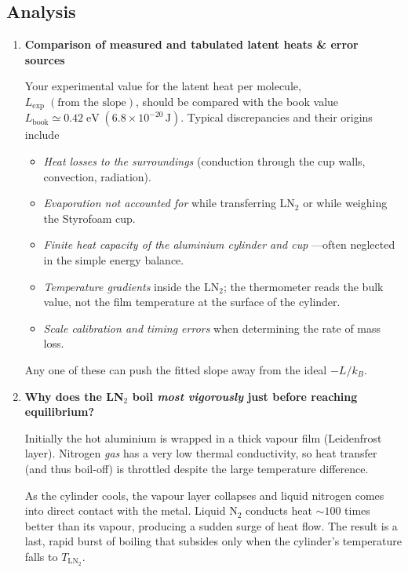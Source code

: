 \documentclass[12pt]{article}
\theoremstyle{definition} %
\theoremstyle{plain} %
\begin{document}
\subsection*{Analysis}

\begin{enumerate}
  \item \textbf{Comparison of measured and tabulated latent heats \& error sources}

        Your experimental value for the latent heat per molecule,
        \(
           L_{\text{exp}}\;(\text{from the slope})
        \),
        should be compared with the book value  
        \(
           L_{\text{book}}\simeq 0.42\;\text{eV}\;(6.8\times10^{-20}\,\mathrm{J})
        \).
        Typical discrepancies and their origins include
        \begin{itemize}
          \item \emph{Heat losses to the surroundings}  
                (conduction through the cup walls, convection, radiation).
          \item \emph{Evaporation not accounted for} while transferring LN\(_2\)
                or while weighing the Styrofoam cup.
          \item \emph{Finite heat capacity of the aluminium cylinder and cup}  
                —often neglected in the simple energy balance.
          \item \emph{Temperature gradients} inside the LN\(_2\); the
                thermometer reads the bulk value, not the film temperature at
                the surface of the cylinder.
          \item \emph{Scale calibration and timing errors} when determining the
                rate of mass loss.
        \end{itemize}
        Any one of these can push the fitted slope away from the ideal
        \(-L/k_B\).

  \item \textbf{Why does the LN\(_2\) boil \emph{most vigorously} just before
        reaching equilibrium?}

        Initially the hot aluminium is wrapped in a thick vapour film
        (Leidenfrost layer).  
        Nitrogen \emph{gas} has a very low thermal conductivity, so
        heat transfer (and thus boil-off) is throttled despite the large
        temperature difference.

        As the cylinder cools, the vapour layer collapses and liquid
        nitrogen comes into direct contact with the metal.
        Liquid N\(_2\) conducts heat \(\sim\! 100\) times better than its
        vapour, producing a sudden surge of heat flow.
        The result is a last, rapid burst of boiling that subsides
        only when the cylinder’s temperature falls to \(T_{\text{LN}_2}\).


\end{enumerate}
\end{document}
